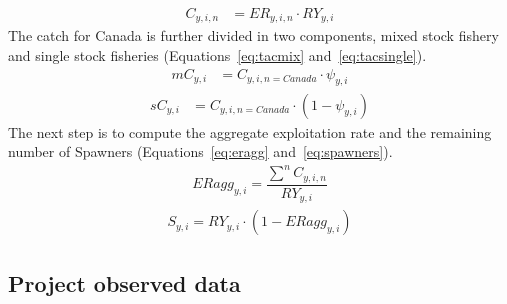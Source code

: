\documentclass[11pt]{book}
\begin{document}
\begin{align}
  {C}_{y,i,n} &= ER_{y,i,n} \cdot RY_{y,i}
  \label{eq:Catagg}
\end{align}
The catch for Canada is further divided in two components, mixed stock fishery and single stock fisheries (Equations~\ref{eq:tacmix} and~\ref{eq:tacsingle}).
\begin{align}
\label{eq:tacmix}
  {mC}_{y,i} &=  C_{y,i,n=Canada} \cdot \psi_{y,i} 
\end{align}
\begin{align}
  {sC}_{y,i} &= C_{y,i,n=Canada} \cdot (1- \psi_{y,i})
  \label{eq:tacsingle}
\end{align}
The next step is to compute the aggregate exploitation rate and the remaining number of Spawners (Equations~\ref{eq:eragg} and~\ref{eq:spawners}).
\begin{align}
  \label{eq:eragg}
  ERagg_{y,i} = \dfrac{\sum^n C_{y,i,n}}{RY_{y,i}}
\end{align}
\begin{align}
  S_{y,i} = RY_{y,i} \cdot(1-ERagg_{y,i}) 
   \label{eq:spawners}
\end{align}
\hypertarget{project-observed-data}{%
\subsection{Project observed data}\label{project-observed-data}}
\end{document}
